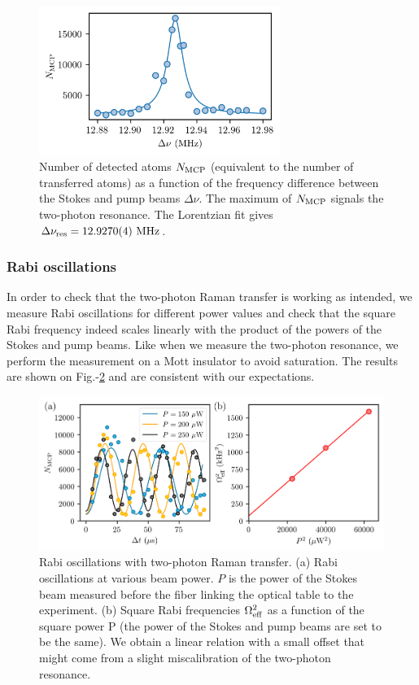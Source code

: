 \begin{figure}
    \centering
    \includegraphics[width=0.7\textwidth]{Fig/Chapter3/raman_res.png}
    \caption[Two-photon Raman transfer resonance]{Number of detected atoms $N_{\rm{MCP}}$ (equivalent to the number of transferred atoms) as a function of the frequency difference between the Stokes and pump beams $\Delta \nu$. The maximum of $N_{\rm{MCP}}$ signals the two-photon resonance. The Lorentzian fit gives $\Delta \nu_{\rm{res}} = 12.9270(4) \ \rm{MHz}$.}
    \label{fig:raman_resonance}
\end{figure}

\subsubsection{Rabi oscillations}

In order to check that the two-photon Raman transfer is working as intended, we measure Rabi oscillations for different power values and check that the square Rabi frequency indeed scales linearly with the product of the powers of the Stokes and pump beams. Like when we measure the two-photon resonance, we perform the measurement on a Mott insulator to avoid saturation. The results are shown on Fig.-\ref{fig:rabi_flop} and are consistent with our expectations.

\begin{figure}
    \centering
    \includegraphics[width=\textwidth]{Fig/Chapter3/rabi_flop.png}
    \caption[Rabi oscillations with two-photon Raman transfer]{Rabi oscillations with two-photon Raman transfer. (a) Rabi oscillations at various beam power. $P$ is the power of the Stokes beam measured before the fiber linking the optical table to the experiment. (b) Square Rabi frequencies $\Omega^2_{\rm{eff}}$ as a function of the square power P (the power of the Stokes and pump beams are set to be the same). We obtain a linear relation with a small offset that might come from a slight miscalibration of the two-photon resonance.}
    \label{fig:rabi_flop}
\end{figure}

